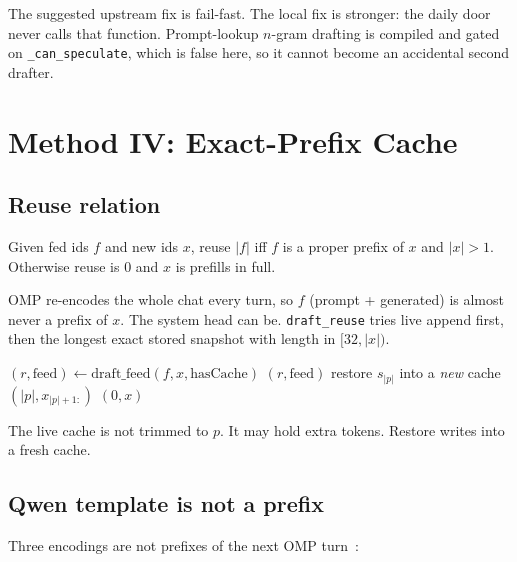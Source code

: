 The suggested upstream fix is fail-fast. The local fix is stronger: the daily door never calls that function. Prompt-lookup $n$-gram drafting is compiled and gated on \texttt{\_can\_speculate}, which is false here, so it cannot become an accidental second drafter.

\section{Method IV: Exact-Prefix Cache}
\label{sec:prefix}

\subsection{Reuse relation}

\begin{definition}
Given fed ids $f$ and new ids $x$, reuse $|f|$ iff $f$ is a proper prefix of $x$ and $|x|>1$. Otherwise reuse is $0$ and $x$ is prefills in full.
\end{definition}

OMP re-encodes the whole chat every turn, so $f$ (prompt + generated) is almost never a prefix of $x$. The system head can be. \texttt{draft\_reuse} tries live append first, then the longest exact stored snapshot with length in $[32, |x|)$.

\begin{algorithm}[t]
\caption{Exact-prefix reuse (never a partial trim)}
\begin{algorithmic}[1]
\State $(r, \mathrm{feed}) \leftarrow \mathrm{draft\_feed}(f, x, \mathrm{hasCache})$
 \Return $(r, \mathrm{feed})$
\EndIf
{}
  \State restore $s_{|p|}$ into a \emph{new} cache
  \State \Return $(|p|, x_{|p|+1:})$
\EndIf
\State \Return $(0, x)$
\end{algorithmic}
\end{algorithm}

The live cache is not trimmed to $p$. It may hold extra tokens. Restore writes into a fresh cache.

\subsection{Qwen template is not a prefix}

Three encodings are not prefixes of the next OMP turn~\citep{qwen31826,mlxengine176}:

